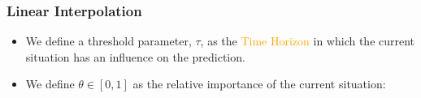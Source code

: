 \documentclass[t]{beamer}
\begin{document}
\begin{frame}\frametitle{Linear Interpolation}
\begin{itemize}
\item<4-> We define a threshold parameter, $\tau$, as the \textcolor{orange}{Time Horizon} in which the current situation has an influence on the prediction.
\item<5-> We define $\theta \in \left[ 0, 1 \right]$ as the relative importance of the current situation:
\end{itemize}
\end{frame}
\end{document}
